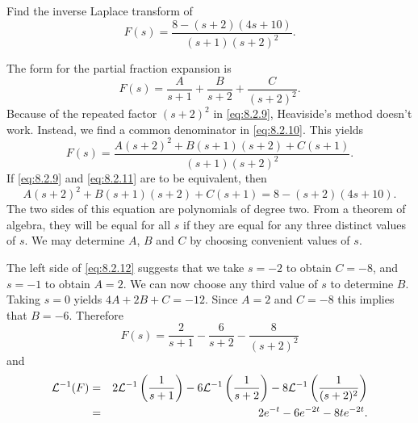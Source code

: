 \documentclass{ximera}
\begin{document}
\begin{example}\label{example:8.2.6} Find the inverse Laplace transform
of
\begin{equation}\label{eq:8.2.9}
F(s)=\frac{8-(s+2)(4s+10)}{(s+1)(s+2)^2}.
\end{equation}
\begin{explanation}
The  form for the partial fraction expansion  is
\begin{equation}\label{eq:8.2.10}
F(s)=\frac{A}{s+1}+\frac{B}{s+2}+\frac{C}{(s+2)^2}.
\end{equation}
Because of the repeated factor $(s+2)^2$ in \eqref{eq:8.2.9}, Heaviside's
method doesn't work. Instead, we find a common denominator in
\eqref{eq:8.2.10}. This yields
\begin{equation}\label{eq:8.2.11}
F(s)=\frac{A(s+2)^2+B(s+1)(s+2)+C(s+1)}{(s+1)(s+2)^2}.
\end{equation}
If  \eqref{eq:8.2.9} and  \eqref{eq:8.2.11} are to be equivalent, then
\begin{equation}\label{eq:8.2.12}
A(s+2)^2+B(s+1)(s+2)+C(s+1)=8-(s+2)(4s+10).
\end{equation}
The two sides of this equation are polynomials of degree two. From a
theorem of algebra, they will be equal for all $s$ if they are equal
for any three distinct values of $s$. We may determine $A$, $B$ and
$C$ by choosing convenient values of $s$.

The left side of \eqref{eq:8.2.12} suggests that we take $s=-2$ to obtain
$C=-8$, and $s=-1$ to obtain $A=2$. We can now choose any third value
of $s$ to determine $B$. Taking $s=0$ yields $4A+2B+C=-12$. Since
$A=2$ and $C=-8$ this implies that $B=-6$. Therefore
$$
F(s)=\frac{2}{s+1}-\frac{6}{s+2}-\frac{8}{(s+2)^2}
$$
and
\begin{eqnarray*}
{\cal L}^{-1}(F)&=&
2{\cal L}^{-1}\left(\frac{1}{s+1}\right)-6{\cal L}^{-1}\left(\frac{1}{s+2}\right)-8{\cal L}^{-1}\left(\frac{1}{(s+2)^2}\right)\\
&=&2e^{-t}-6e^{-2t}-8te^{-2t}.
\end{eqnarray*}
\end{explanation}
\end{example}
\end{document}
